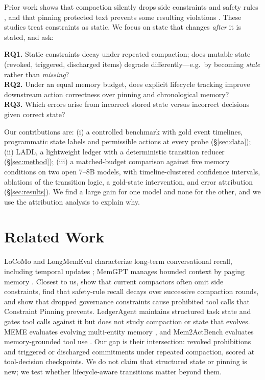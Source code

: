 \documentclass[11pt]{article}
\newcommand{\ours}{\textsc{LADL}\xspace}
\begin{document}
Prior work shows that compaction silently drops side constraints and safety rules \citep{wang2026lost,zerhoudi2026cliff,chen2026governance}, and that pinning protected text prevents some resulting violations \citep{chen2026governance}. These studies treat constraints as static. We focus on state that changes \emph{after} it is stated, and ask:

\textbf{RQ1.} Static constraints decay under repeated compaction; does mutable state (revoked, triggered, discharged items) degrade differently---e.g.\ by becoming \emph{stale} rather than \emph{missing}?\\
\textbf{RQ2.} Under an equal memory budget, does explicit lifecycle tracking improve downstream action correctness over pinning and chronological memory?\\
\textbf{RQ3.} Which errors arise from incorrect stored state versus incorrect decisions given correct state?

Our contributions are: (i) a controlled benchmark with gold event timelines, programmatic state labels and permissible actions at every probe (\S\ref{sec:data}); (ii) \ours, a lightweight ledger with a deterministic transition reducer (\S\ref{sec:method}); (iii) a matched-budget comparison against five memory conditions on two open 7--8B models, with timeline-clustered confidence intervals, ablations of the transition logic, a gold-state intervention, and error attribution (\S\ref{sec:results}). We find a large gain for one model and none for the other, and we use the attribution analysis to explain why.

\section{Related Work}

LoCoMo and LongMemEval characterize long-term conversational recall, including temporal updates \citep{maharana2024locomo,wu2025longmemeval}; MemGPT manages bounded context by paging memory \citep{packer2023memgpt}. Closest to us, \citet{wang2026lost} show that current compactors often omit side constraints, \citet{zerhoudi2026cliff} find that safety-rule recall decays over successive compaction rounds, and \citet{chen2026governance} show that dropped governance constraints cause prohibited tool calls that Constraint Pinning prevents. LedgerAgent maintains structured task state and gates tool calls against it \citep{uddin2026ledgeragent} but does not study compaction or state that evolves. MEME evaluates evolving multi-entity memory \citep{jung2026meme}, and Mem2ActBench evaluates memory-grounded tool use \citep{shen2026mem2act}. Our gap is their intersection: revoked prohibitions and triggered or discharged commitments under repeated compaction, scored at tool-decision checkpoints. We do not claim that structured state or pinning is new; we test whether lifecycle-aware transitions matter beyond them.
\end{document}
